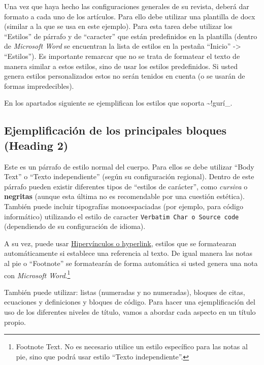 \documentclass[
    a4paper,%
    DIV=calc,%
    abstract=true%
  ]{scrartcl}%
\begin{document}
  Una vez que haya hecho las configuraciones generales de su revista,
  deberá dar formato a cada uno de los artículos. Para ello debe
  utilizar una plantilla de docx (similar a la que se usa en este
  ejemplo). Para esta tarea debe utilizar los ``Estilos'' de párrafo y
  de ``caracter'' que están predefinidos en la plantilla (dentro de
  \emph{Microsoft Word} se encuentran la lista de estilos en la pestaña
  ``Inicio'' -\textgreater{} ``Estilos''). Es importante remarcar que no
  se trata de formatear el texto de manera similar a estos estilos, sino
  de usar los estilos predefinidos. Si usted genera estilos
  personalizados estos no serán tenidos en cuenta (o se usarán de formas
  impredecibles).

  En los apartados siguiente se ejemplifican los estilos que soporta
  \textasciitilde!gurí\_.

  \subsection{Ejemplificación de los principales bloques (Heading
  2)}\label{ejemplificaciuxf3n-de-los-principales-bloques-heading-2}

  Este es un párrafo de estilo normal del cuerpo. Para ellos se debe
  utilizar ``Body Text'' o ``Texto independiente'' (según su
  configuración regional). Dentro de este párrafo pueden existir
  diferentes tipos de ``estilos de carácter'', como \emph{cursiva} o
  \textbf{negritas} (aunque esta última no es recomendable por una
  cuestión estética). También puede incluir tipografías monoespaciadas
  (por ejemplo, para código informático) utilizando el estilo de
  caracter
  \texttt{Verbatim\textasciigrave{}\textasciigrave{}\ \textasciigrave{}\textasciigrave{}Char\textasciigrave{}\textasciigrave{}\ o\ \textasciigrave{}\textasciigrave{}Source\textasciigrave{}\textasciigrave{}\ \textasciigrave{}\textasciigrave{}code}
  (dependiendo de su configuración de idioma).

  A su vez, puede usar \href{http://example.com}{Hipervínculos o
  hyperlink}, estilos que se formatearan automáticamente si establece
  una referencia al texto. De igual manera las notas al pie o
  ``Footnote'' se formatearán de forma automática si usted genera una
  nota con \emph{Microsoft Word}.\footnote{Footnote Text. No es
    necesario utilice un estilo específico para las notas al pie, sino
    que podrá usar estilo ``Texto independiente''.}

  También puede utilizar: listas (numeradas y no numeradas), bloques de
  citas, ecuaciones y definiciones y bloques de código. Para hacer una
  ejemplificación del uso de los diferentes niveles de título, vamos a
  abordar cada aspecto en un título propio.
\end{document}
